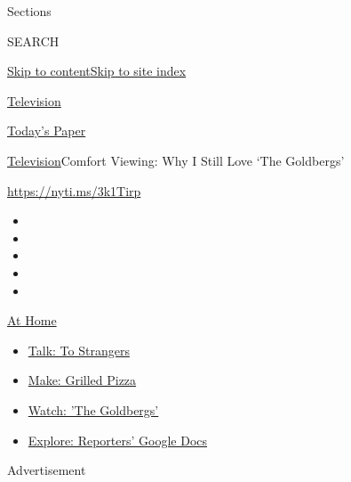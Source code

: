 Sections

SEARCH

\protect\hyperlink{site-content}{Skip to
content}\protect\hyperlink{site-index}{Skip to site index}

\href{https://www.nytimes.com/section/arts/television}{Television}

\href{https://myaccount.nytimes.com/auth/login?response_type=cookie\&client_id=vi}{}

\href{https://www.nytimes.com/section/todayspaper}{Today's Paper}

\href{/section/arts/television}{Television}\textbar{}Comfort Viewing:
Why I Still Love `The Goldbergs'

\url{https://nyti.ms/3k1Tirp}

\begin{itemize}
\item
\item
\item
\item
\item
\end{itemize}

\href{https://www.nytimes.com/spotlight/at-home?action=click\&pgtype=Article\&state=default\&region=TOP_BANNER\&context=at_home_menu}{At
Home}

\begin{itemize}
\tightlist
\item
  \href{https://www.nytimes.com/2020/08/03/well/family/the-benefits-of-talking-to-strangers.html?action=click\&pgtype=Article\&state=default\&region=TOP_BANNER\&context=at_home_menu}{Talk:
  To Strangers}
\item
  \href{https://www.nytimes.com/2020/08/01/at-home/coronavirus-make-pizza-on-a-grill.html?action=click\&pgtype=Article\&state=default\&region=TOP_BANNER\&context=at_home_menu}{Make:
  Grilled Pizza}
\item
  \href{https://www.nytimes.com/2020/07/31/arts/television/goldbergs-abc-stream.html?action=click\&pgtype=Article\&state=default\&region=TOP_BANNER\&context=at_home_menu}{Watch:
  'The Goldbergs'}
\item
  \href{https://www.nytimes.com/interactive/2020/at-home/even-more-reporters-editors-diaries-lists-recommendations.html?action=click\&pgtype=Article\&state=default\&region=TOP_BANNER\&context=at_home_menu}{Explore:
  Reporters' Google Docs}
\end{itemize}

Advertisement

